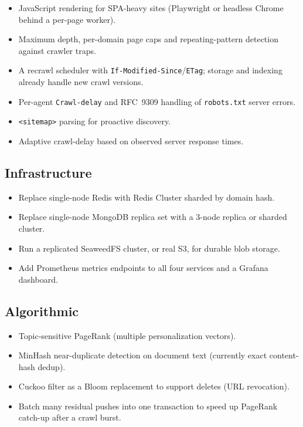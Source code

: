 \documentclass[11pt,a4paper]{article}
\newcommand{\code}[1]{\texttt{#1}}
\begin{document}
\begin{itemize}[leftmargin=1.4em]
  \item JavaScript rendering for SPA-heavy sites (Playwright or headless Chrome behind a per-page worker).
  \item Maximum depth, per-domain page caps and repeating-pattern detection against crawler traps.
  \item A recrawl scheduler with \code{If-Modified-Since}/\code{ETag}; storage and indexing already handle new crawl versions.
  \item Per-agent \code{Crawl-delay} and RFC~9309 handling of \code{robots.txt} server errors.
  \item \code{<sitemap>} parsing for proactive discovery.
  \item Adaptive crawl-delay based on observed server response times.
\end{itemize}

\subsection{Infrastructure}

\begin{itemize}[leftmargin=1.4em]
  \item Replace single-node Redis with Redis Cluster sharded by domain hash.
  \item Replace single-node MongoDB replica set with a 3-node replica or sharded cluster.
  \item Run a replicated SeaweedFS cluster, or real S3, for durable blob storage.
  \item Add Prometheus metrics endpoints to all four services and a Grafana dashboard.
\end{itemize}

\subsection{Algorithmic}
\label{sec:future-algorithmic}

\begin{itemize}[leftmargin=1.4em]
  \item Topic-sensitive PageRank (multiple personalization vectors).
  \item MinHash near-duplicate detection on document text (currently exact content-hash dedup).
  \item Cuckoo filter as a Bloom replacement to support deletes (URL revocation).
  \item Batch many residual pushes into one transaction to speed up PageRank catch-up after a crawl burst.
\end{itemize}
\end{document}
